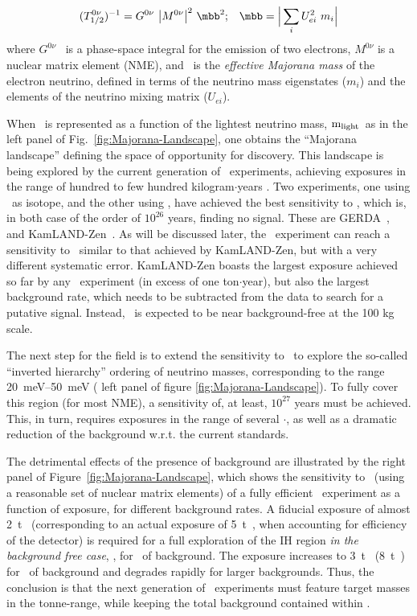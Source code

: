 \begin{equation}
(T^{0\nu}_{1/2})^{-1} = G^{0\nu} \ \big|M^{0\nu}\big|^{2} \ \mbb^{2}; \,\,\, \,\,
\mbb = \Big| \sum_{i} U^{2}_{ei} \ m_{i} \Big|
\label{eq:mbb}
\end{equation}
%
where $G^{0\nu}$~ is a phase-space integral for the emission of two electrons, $M^{0\nu}$ is a nuclear matrix element (NME), and \mbb\ is the \emph{effective Majorana mass} of the electron neutrino, defined in terms of the neutrino mass eigenstates ($m_{i}$) and the elements of the neutrino mixing matrix ($U_{ei}$).

When \mbb\ is represented as a function of the lightest neutrino mass, ${\rm m_{light}}$~as in the left panel of Fig.~\ref{fig:Majorana-Landscape}, one obtains the ``Majorana landscape'' defining the space of opportunity for discovery. This landscape is being explored by the current generation of \bbonu\ experiments, achieving exposures in the range of hundred to few hundred kilogram$\cdot$years \cite{Gomez-Cadenas:2019sfa}. Two experiments, one using \GE\ as isotope, and the other using \XE, have achieved the best sensitivity to \Tonu, which is, in both case of the order 
of $10^{26}$ years, finding no signal. These are GERDA~\cite{Agostini:2018tnm}, and KamLAND-Zen~\cite{Gando:2016ji}. As will be discussed later, 
the \Next\ experiment can reach a sensitivity to \Tonu\ similar to that achieved by  KamLAND-Zen, but with a very different systematic error. KamLAND-Zen boasts the largest exposure achieved so far by any \bbonu\ experiment (in excess of one ton$\cdot$year), but also the largest background rate, which needs to be subtracted from the data to search for a putative signal. Instead, \Next\ is expected to be near background-free at the 100 kg scale.

The next step for the field is to extend the sensitivity to \Tonu\ to explore the so-called ``inverted hierarchy'' ordering of neutrino masses, corresponding to the range  \SIrange{20}{50}{\meV} ( left panel of figure \ref{fig:Majorana-Landscape}). To fully cover this region (for most NME),  a sensitivity of, at least,  $10^{27}$ years must be achieved. This, in turn, requires exposures in the range of several \tonne$\cdot$\yr, as well as a dramatic reduction of the background w.r.t. the current standards. 

The detrimental effects of the presence of background are illustrated by the right panel of Figure~\ref{fig:Majorana-Landscape}, which shows the sensitivity to \mbb\ (using a reasonable set of nuclear matrix elements) of a fully efficient \XE\ experiment as a function of exposure, for different background rates.  A fiducial exposure of almost \SI{2}{\tonne\yr} (corresponding to an actual exposure of \SI{5}{\tonne\yr}, when accounting for efficiency of the detector) is required for a full exploration of the IH region {\em in the background free case}, \eg, for \BackgroundFreeLimit\ of background.  The exposure increases to \SI{3}{\tonne\yr} (\SI{8}{\tonne\yr}) for \AlmostBackgroundFreeLimit\ of background and degrades rapidly for larger backgrounds.  Thus, the conclusion is that the next generation of \bbonu\ experiments must feature target masses in the tonne-range, while keeping the total background contained within \AlmostBackgroundFreeRequirement. 
%

